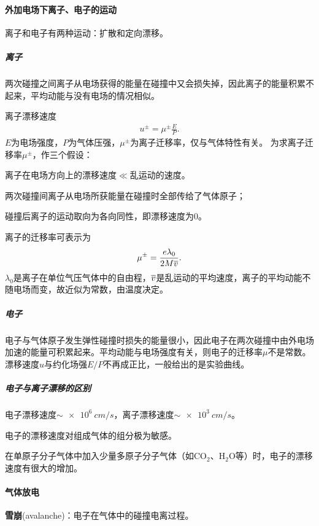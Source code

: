\paragraph{外加电场下离子、电子的运动}
离子和电子有两种运动：扩散和定向漂移。

\subparagraph{离子}
两次碰撞之间离子从电场获得的能量在碰撞中又会损失掉，因此离子的能量积累不起来，平均动能与没有电场的情况相似。

离子漂移速度
\begin{align}
	u^\pm=\mu^\pm\frac EP.
\end{align}
$E$为电场强度，$P$为气体压强，$\mu^\pm$为离子迁移率，仅与气体特性有关。
为求离子迁移率$\mu^\pm$，作三个假设：
\begin{compactenum}
	\item 离子在电场方向上的漂移速度$\ll$乱运动的速度。
	\item 两次碰撞间离子从电场所获能量在碰撞时全部传给了气体原子；
	\item 碰撞后离子的运动取向为各向同性，即漂移速度为0。
\end{compactenum}
离子的迁移率可表示为
\[
	\mu^\pm=\frac{e\lambda_0}{2M\overline{v}}.
\]
$\lambda_0$是离子在单位气压气体中的自由程，$\overline{v}$是乱运动的平均速度，离子的平均动能不随电场而变，故近似为常数，由温度决定。

\subparagraph{电子}电子与气体原子发生弹性碰撞时损失的能量很小，因此电子在两次碰撞中由外电场加速的能量可积累起来。平均动能与电场强度有关，则电子的迁移率$\mu$不是常数。漂移速度$u$与约化场强$E/P$不再成正比，一般给出的是实验曲线。

\subparagraph{电子与离子漂移的区别}
\begin{compactenum}
	\item 电子漂移速度$\sim\SI{e6}{cm/s}$，离子漂移速度$\sim\SI{e3}{cm/s}$。
	\item 电子的漂移速度对组成气体的组分极为敏感。
	
	在单原子分子气体中加入少量多原子分子气体（如CO$_2$、H$_2$O等）时，电子的漂移速度有很大的增加。
\end{compactenum}
\paragraph{气体放电}
\textbf{雪崩}(avalanche)：电子在气体中的碰撞电离过程。

